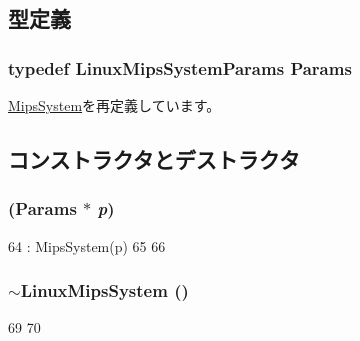 \subsection{型定義}
\hypertarget{classLinuxMipsSystem_a3d1083cbefc15728ca643470f9efbf13}{
\subsubsection[{Params}]{\setlength{\rightskip}{0pt plus 5cm}typedef LinuxMipsSystemParams {\bf Params}}}
\label{classLinuxMipsSystem_a3d1083cbefc15728ca643470f9efbf13}


\hyperlink{classMipsSystem_acf01be080284e8262bc1ff41fbd1710c}{MipsSystem}を再定義しています。

\subsection{コンストラクタとデストラクタ}
\hypertarget{classLinuxMipsSystem_a27aa28fc4cff867ee820c243a8d8abf2}{
\subsubsection[{LinuxMipsSystem}]{ ({\bf Params} $\ast$ {\em p})}}
\label{classLinuxMipsSystem_a27aa28fc4cff867ee820c243a8d8abf2}



\begin{DoxyCode}
64     : MipsSystem(p)
65 {
66 }
\end{DoxyCode}
\hypertarget{classLinuxMipsSystem_a35954832db55ae1b6c416ab9db42e265}{
\subsubsection[{$\sim$LinuxMipsSystem}]{\setlength{\rightskip}{0pt plus 5cm}$\sim${\bf LinuxMipsSystem} ()}}
\label{classLinuxMipsSystem_a35954832db55ae1b6c416ab9db42e265}



\begin{DoxyCode}
69 {
70 }
\end{DoxyCode}


